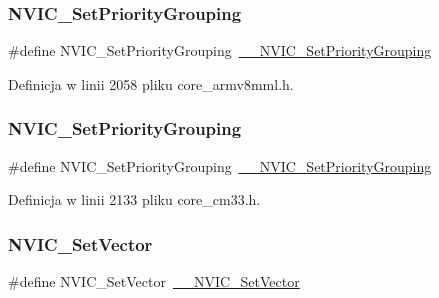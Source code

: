 \subsubsection{\texorpdfstring{N\+V\+I\+C\+\_\+\+Set\+Priority\+Grouping}{NVIC\_SetPriorityGrouping}\hspace{0.1cm}{\footnotesize\ttfamily [9/10]}}
{\footnotesize\ttfamily \#define N\+V\+I\+C\+\_\+\+Set\+Priority\+Grouping~\hyperlink{group___c_m_s_i_s___core___n_v_i_c_functions_gafc94dcbaee03e4746ade1f5bb9aaa56d}{\+\_\+\+\_\+\+N\+V\+I\+C\+\_\+\+Set\+Priority\+Grouping}}



Definicja w linii 2058 pliku core\+\_\+armv8mml.\+h.

\mbox{\label{group___c_m_s_i_s___core___n_v_i_c_functions_ga0e798d5aec68cdd8263db86a76df788f}} 
\subsubsection{\texorpdfstring{N\+V\+I\+C\+\_\+\+Set\+Priority\+Grouping}{NVIC\_SetPriorityGrouping}\hspace{0.1cm}{\footnotesize\ttfamily [10/10]}}
{\footnotesize\ttfamily \#define N\+V\+I\+C\+\_\+\+Set\+Priority\+Grouping~\hyperlink{group___c_m_s_i_s___core___n_v_i_c_functions_gafc94dcbaee03e4746ade1f5bb9aaa56d}{\+\_\+\+\_\+\+N\+V\+I\+C\+\_\+\+Set\+Priority\+Grouping}}



Definicja w linii 2133 pliku core\+\_\+cm33.\+h.

\mbox{\label{group___c_m_s_i_s___core___n_v_i_c_functions_ga804af63bb4c4c317387897431814775d}} 
\subsubsection{\texorpdfstring{N\+V\+I\+C\+\_\+\+Set\+Vector}{NVIC\_SetVector}\hspace{0.1cm}{\footnotesize\ttfamily [1/12]}}
{\footnotesize\ttfamily \#define N\+V\+I\+C\+\_\+\+Set\+Vector~\hyperlink{group___c_m_s_i_s___core___n_v_i_c_functions_ga0df355460bc1783d58f9d72ee4884208}{\+\_\+\+\_\+\+N\+V\+I\+C\+\_\+\+Set\+Vector}}



